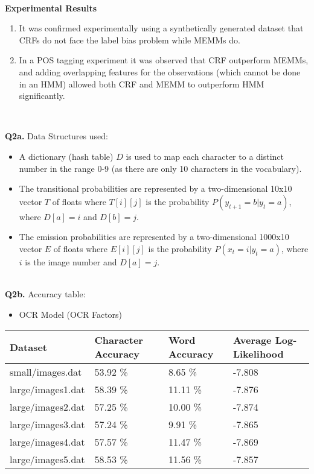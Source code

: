 \documentclass[]{article}
\begin{document}
~
\vspace*{-0.2cm}
\\
\centerline{\bfseries Experimental Results}
\begin{enumerate}[leftmargin=*]
\item It was confirmed experimentally using a synthetically generated dataset that CRFs do not face the label bias problem while MEMMs do.
\item In a POS tagging experiment it was observed that CRF outperform MEMMs, and adding overlapping features for the observations (which cannot be done in an HMM) allowed both CRF and MEMM to outperform HMM significantly.
\end{enumerate} 
~\\
\par \noindent
{{\bfseries Q2a.}} Data Structures used:
\begin{itemize}
\item A dictionary (hash table) $D$ is used to map each character to a distinct number in the range 0-9 (as there are only 10 characters in the vocabulary).
\item The transitional probabilities are represented by a two-dimensional 10x10 vector $T$ of floats where $T[i][j]$ is the probability $P(y_{t+1}=b | y_t = a)$, where $D[a] = i$ and $D[b]=j$.
\item The emission probabilities are represented by a two-dimensional 1000x10 vector $E$ of floats where $E[i][j]$ is the probability $P(x_t=i|y_t=a)$, where $i$ is the image number and $D[a]=j$.
\end{itemize}
~\\
{{\bfseries Q2b.}} Accuracy table:
\begin{itemize}[leftmargin=*]
\item OCR Model (OCR Factors)
\end{itemize}
\begin{center}
\begin{tabu} to \textwidth { | X[c] | X[c] | X[c] | X[c] |}
\hline
 Dataset & Character Accuracy & Word Accuracy & Average Log-Likelihood \\
\hline
small/images.dat & 53.92 \% & 8.65 \% & -7.808\\
\hline
large/images1.dat & 58.39 \% & 11.11 \% & -7.876\\
\hline
large/images2.dat & 57.25 \% & 10.00 \% & -7.874\\
\hline
large/images3.dat & 57.24 \% & 9.91 \% & -7.865\\
\hline
large/images4.dat & 57.57 \% & 11.47 \% & -7.869\\
\hline
large/images5.dat & 58.53 \% & 11.56 \% & -7.857\\
\hline
\end{tabu}
\end{center}
\end{document}
